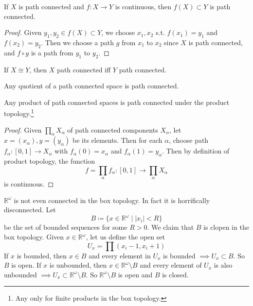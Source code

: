   \begin{theorem}
    If $X$ is path connected and $f: X \rightarrow Y$ is continuous, then $f(X) \subset Y$ is path connected. 
  \end{theorem}
  \begin{proof}
    Given $y_1, y_2 \in f(X) \subset Y$, we choose $x_1, x_2$ s.t. $f(x_1) = y_1$ and $f(x_2) = y_2$. Then we choose a path $g$ from $x_1$ to $x_2$ since $X$ is path connected, and $f \circ g$ is a path from $y_1$ to $y_2$. 
  \end{proof}

  \begin{corollary}
    If $X \cong Y$, then $X$ path connected iff $Y$ path connected. 
  \end{corollary}

  \begin{corollary}
    Any quotient of a path connected space is path connected. 
  \end{corollary}

  \begin{theorem}
    Any product of path connected spaces is path connected under the product topology.\footnote{Any only for finite products in the box topology.}
  \end{theorem}
  \begin{proof}
    Given $\prod_\alpha X_\alpha$ of path connected components $X_\alpha$, let $x = (x_\alpha), y = (y_\alpha)$ be its elements. Then for each $\alpha$, choose path $f_\alpha: [0, 1] \rightarrow X_\alpha$ with $f_\alpha (0) = x_\alpha$ and $f_\alpha (1) = y_\alpha$. Then by definition of product topology, the function 
    \begin{equation}
      f = \prod_\alpha f_\alpha : [0, 1] \rightarrow \prod_\alpha X_\alpha
    \end{equation}
    is continuous. 
  \end{proof}

  \begin{example}
    $\mathbb{R}^\omega$ is not even connected in the box topology. In fact it is horrifically disconnected. Let 
    \begin{equation}
      B \coloneqq \{x \in \mathbb{R}^\omega \mid |x_i| < R\}
    \end{equation}
    be the set of bounded sequences for some $R > 0$. We claim that $B$ is clopen in the box topology. Given $x \in \mathbb{R}^\omega$, let us define the open set
    \begin{equation}
      U_x = \prod (x_i - 1, x_i + 1) 
    \end{equation}
    If $x$ is bounded, then $x \in B$ and every element in $U_x$ is bounded $\implies U_x \subset B$. So $B$ is open. If $x$ is unbounded, then $x \in \mathbb{R}^\omega \setminus B$ and every element of $U_x$ is also unbounded $\implies U_x \subset \mathbb{R}^\omega \setminus B$. So $\mathbb{R}^\omega \setminus B$ is open and $B$ is closed. 
  \end{example}

